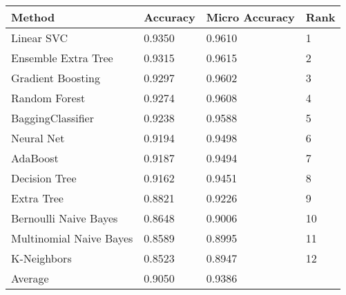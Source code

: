 \begin{tabular}{|l|l|l|l| }
\hline
Method                  & Accuracy & Micro Accuracy & Rank \\ \hline
Linear SVC              & 0.9350 & 0.9610 & 1\\
Ensemble Extra Tree     & 0.9315 & 0.9615 & 2\\
Gradient Boosting       & 0.9297 & 0.9602 & 3\\
Random Forest           & 0.9274 & 0.9608 & 4\\
BaggingClassifier       & 0.9238 & 0.9588 & 5\\
Neural Net              & 0.9194 & 0.9498 & 6\\
AdaBoost                & 0.9187 & 0.9494 & 7\\
Decision Tree           & 0.9162 & 0.9451 & 8\\
Extra Tree              & 0.8821 & 0.9226 & 9\\
Bernoulli Naive Bayes   & 0.8648 & 0.9006 & 10\\
Multinomial Naive Bayes & 0.8589 & 0.8995 & 11\\
K-Neighbors             & 0.8523 & 0.8947 & 12\\
Average & 0.9050 & 0.9386 & \\
\hline
\end{tabular}